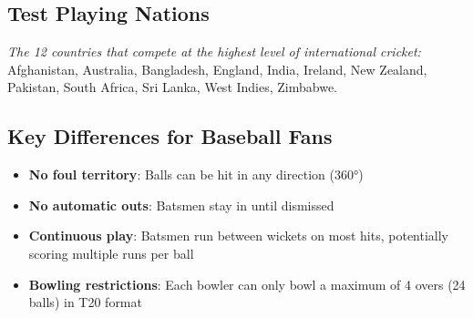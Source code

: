 \documentclass{article}[12pt]
\begin{document}
\subsection*{Test Playing Nations}
\label{listofnations}
\textit{The 12 countries that compete at the highest level of international cricket:  
}
Afghanistan, Australia, Bangladesh, England, India, Ireland, New Zealand, Pakistan, South Africa, Sri Lanka, West Indies, Zimbabwe.

\subsection*{Key Differences for Baseball Fans}
\begin{itemize}
    \item \textbf{No foul territory}: Balls can be hit in any direction (360°)
    \item \textbf{No automatic outs}: Batsmen stay in until dismissed
    \item \textbf{Continuous play}: Batsmen run between wickets on most hits, potentially scoring multiple runs per ball
    \item \textbf{Bowling restrictions}: Each bowler can only bowl a maximum of 4 overs (24 balls) in T20 format
\end{itemize}
\end{document}
